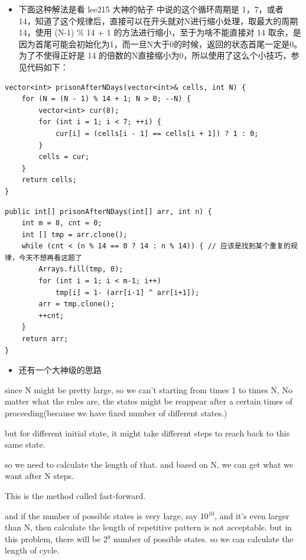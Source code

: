 \documentclass[9pt, b5paper]{article}
\begin{document}
\begin{itemize}
\item 下面这种解法是看 lee215 大神的帖子 中说的这个循环周期是 1，7，或者 14，知道了这个规律后，直接可以在开头就对N进行缩小处理，取最大的周期 14，使用 (N-1) \% 14 + 1 的方法进行缩小，至于为啥不能直接对 14 取余，是因为首尾可能会初始化为1，而一旦N大于0的时候，返回的状态首尾一定是0。为了不使得正好是 14 的倍数的N直接缩小为0，所以使用了这么个小技巧，参见代码如下：
\end{itemize}
\begin{verbatim}
vector<int> prisonAfterNDays(vector<int>& cells, int N) {
    for (N = (N - 1) % 14 + 1; N > 0; --N) {
        vector<int> cur(8);
        for (int i = 1; i < 7; ++i) {
            cur[i] = (cells[i - 1] == cells[i + 1]) ? 1 : 0;
        }
        cells = cur;
    }
    return cells;
}
\end{verbatim}
\begin{verbatim}
public int[] prisonAfterNDays(int[] arr, int n) {
    int m = 8, cnt = 0;
    int [] tmp = arr.clone();
    while (cnt < (n % 14 == 0 ? 14 : n % 14)) { // 应该是找到某个重复的规律，今天不想再看这题了
        Arrays.fill(tmp, 0);
        for (int i = 1; i < m-1; i++) 
            tmp[i] = 1- (arr[i-1] ^ arr[i+1]);
        arr = tmp.clone();
        ++cnt;
    }
    return arr;
}
\end{verbatim}
\begin{itemize}
\item 还有一个大神级的思路
\end{itemize}
since N might be pretty large, so we can’t starting from times 1 to times N, No matter what the rules are, the states might be reappear after a certain times of proceeding(because we have fixed number of different states.)

but for different initial state, it might take different steps to reach back to this same state.

so we need to calculate the length of that. and based on N, we can get what we want after N steps.

This is the method called fast-forward.

and if the number of possible states is very large, say 10$^{\text{10}}$, and it’s even larger than N, then calculate the length of repetitive pattern is not acceptable.
but in this problem, there will be 2$^{\text{8}}$ number of possible states. so we can calculate the length of cycle.
\end{document}
